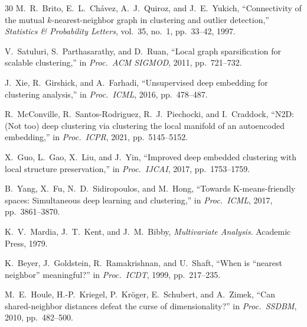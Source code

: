 \documentclass[conference]{IEEEtran}
\begin{document}
\begin{thebibliography}{30}
M.~R.~Brito, E.~L.~Ch\'{a}vez, A.~J.~Quiroz, and J.~E.~Yukich, ``Connectivity of the mutual $k$-nearest-neighbor graph in clustering and outlier detection,'' \emph{Statistics \& Probability Letters}, vol.~35, no.~1, pp.~33--42, 1997.

V.~Satuluri, S.~Parthasarathy, and D.~Ruan, ``Local graph sparsification for scalable clustering,'' in \emph{Proc.\ ACM SIGMOD}, 2011, pp.~721--732.

J.~Xie, R.~Girshick, and A.~Farhadi, ``Unsupervised deep embedding for clustering analysis,'' in \emph{Proc.\ ICML}, 2016, pp.~478--487.

R.~McConville, R.~Santos-Rodriguez, R.~J.~Piechocki, and I.~Craddock, ``N2D: (Not too) deep clustering via clustering the local manifold of an autoencoded embedding,'' in \emph{Proc.\ ICPR}, 2021, pp.~5145--5152.

X.~Guo, L.~Gao, X.~Liu, and J.~Yin, ``Improved deep embedded clustering with local structure preservation,'' in \emph{Proc.\ IJCAI}, 2017, pp.~1753--1759.

B.~Yang, X.~Fu, N.~D.~Sidiropoulos, and M.~Hong, ``Towards K-means-friendly spaces: Simultaneous deep learning and clustering,'' in \emph{Proc.\ ICML}, 2017, pp.~3861--3870.

K.~V.~Mardia, J.~T.~Kent, and J.~M.~Bibby, \emph{Multivariate Analysis}. Academic Press, 1979.

K.~Beyer, J.~Goldstein, R.~Ramakrishnan, and U.~Shaft, ``When is ``nearest neighbor'' meaningful?'' in \emph{Proc.\ ICDT}, 1999, pp.~217--235.

M.~E.~Houle, H.-P.~Kriegel, P.~Kr\"{o}ger, E.~Schubert, and A.~Zimek, ``Can shared-neighbor distances defeat the curse of dimensionality?'' in \emph{Proc.\ SSDBM}, 2010, pp.~482--500.

\end{thebibliography}
\end{document}
